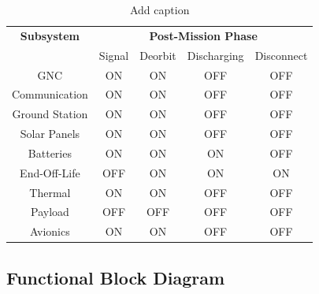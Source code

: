 \begin{table}[htbp]
  \centering
  \caption{Add caption}
    \begin{tabular}{|c|c|c|c|c|}
    \hline
    \textbf{Subsystem} & \multicolumn{4}{c|}{\textbf{Post-Mission Phase}} \\
          & \multicolumn{1}{c}{Signal} & \multicolumn{1}{c}{Deorbit} & \multicolumn{1}{c}{Discharging} & Disconnect \\
    GNC   & \cellcolor[rgb]{ .573,  .816,  .314}ON & \cellcolor[rgb]{ .573,  .816,  .314}ON & \cellcolor[rgb]{ .753,  0,  0}OFF & \cellcolor[rgb]{ .753,  0,  0}OFF \\
Communication & \cellcolor[rgb]{ .573,  .816,  .314}ON & \cellcolor[rgb]{ .573,  .816,  .314}ON & \cellcolor[rgb]{ .753,  0,  0}OFF & \cellcolor[rgb]{ .753,  0,  0}OFF \\
  Ground Station & \cellcolor[rgb]{ .573,  .816,  .314}ON & \cellcolor[rgb]{ .573,  .816,  .314}ON & \cellcolor[rgb]{ .753,  0,  0}OFF & \cellcolor[rgb]{ .753,  0,  0}OFF \\
    Solar Panels  & \cellcolor[rgb]{ .573,  .816,  .314}ON & \cellcolor[rgb]{ .573,  .816,  .314}ON & \cellcolor[rgb]{ .753,  0,  0}OFF & \cellcolor[rgb]{ .753,  0,  0}OFF \\
    Batteries  & \cellcolor[rgb]{ .573,  .816,  .314}ON & \cellcolor[rgb]{ .573,  .816,  .314}ON & \cellcolor[rgb]{ .573,  .816,  .314}ON & \cellcolor[rgb]{ .753,  0,  0}OFF \\
End-Off-Life & \cellcolor[rgb]{ .753,  0,  0}OFF & \cellcolor[rgb]{ .573,  .816,  .314}ON & \cellcolor[rgb]{ .573,  .816,  .314}ON & \cellcolor[rgb]{ .573,  .816,  .314}ON \\
Thermal  & \cellcolor[rgb]{ .573,  .816,  .314}ON & \cellcolor[rgb]{ .573,  .816,  .314}ON & \cellcolor[rgb]{ .753,  0,  0}OFF & \cellcolor[rgb]{ .753,  0,  0}OFF \\
  Payload & \cellcolor[rgb]{ .753,  0,  0}OFF & \cellcolor[rgb]{ .753,  0,  0}OFF & \cellcolor[rgb]{ .753,  0,  0}OFF & \cellcolor[rgb]{ .753,  0,  0}OFF \\
  Avionics & \cellcolor[rgb]{ .753,  0,  0}ON & \cellcolor[rgb]{ .753,  0,  0}ON & \cellcolor[rgb]{ .753,  0,  0}OFF & \cellcolor[rgb]{ .753,  0,  0}OFF \\
    \hline
    \end{tabular}%
  \label{tab:addlabel}%
\end{table}%



\subsection{Functional Block Diagram}

